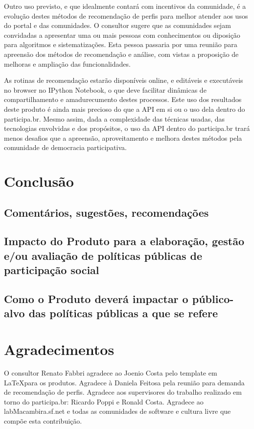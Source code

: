 \documentclass[12pt]{article}
\begin{document}
Outro uso previsto, e que idealmente contará com incentivos da comunidade, é a evolução destes métodos de recomendação de perfis para melhor atender aos usos do portal e das comunidades. O consultor sugere que as comunidades sejam convidadas a apresentar uma ou mais pessoas com conhecimentos ou diposição para algoritmos e sistematizações. Esta pessoa passaria por uma reunião para apreensão dos métodos de recomendação e análise, com vistas a proposição de melhoras e ampliação das funcionalidades.

As rotinas de recomendação estarão disponíveis online, e editáveis e executáveis no browser no IPython Notebook, o que deve facilitar dinâmicas de compartilhamento e amadurecumento destes processos. Este uso dos resultados deste produto é ainda mais precioso do que a API em si ou o uso dela dentro do participa.br. Mesmo assim, dada a complexidade das técnicas usadas, das tecnologias envolvidas e dos propósitos, o uso da API dentro do participa.br trará menos desafios que a apreensão, aproveitamento e melhora destes métodos pela comunidade de democracia participativa.

\section{Conclusão}
\subsection{Comentários, sugestões, recomendações}

\subsection{Impacto do Produto para a elaboração, gestão e/ou avaliação de políticas públicas de participação social}
\subsection{Como o Produto deverá impactar o público-alvo das políticas públicas a que se refere}
\section{Agradecimentos}
O consultor Renato Fabbri agradece ao Joenio Costa pelo template em \LaTeX para os produtos. Agradece à Daniela Feitosa pela reunião para demanda de recomendação de perfis. Agradece aos supervisores do trabalho realizado em torno do participa.br: Ricardo Poppi e Ronald Costa. Agradece ao labMacambira.sf.net e todas as comunidades de software e cultura livre que compõe esta contribuição.
\newpage

\newpage

\newpage
\printindex
\newpage
%
\appendix
\end{document}
